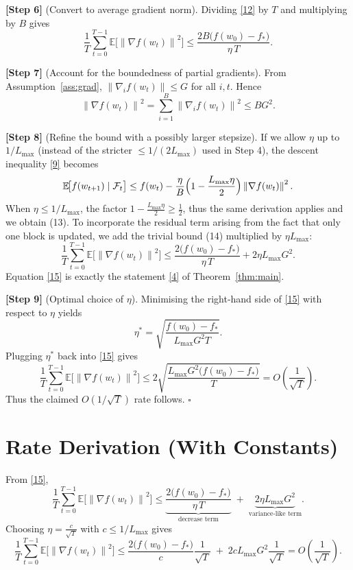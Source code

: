 \documentclass{article}
\newcommand{\E}{\mathbb{E}}
\newcommand{\norm}[1]{\left\lVert#1\right\rVert}
\begin{document}
\noindent\textbf{[Step 6]} (Convert to average gradient norm).  
Dividing \eqref{12} by $T$ and multiplying by $B$ gives
\[
\frac{1}{T}\sum_{t=0}^{T-1}\E\!\big[\norm{\nabla f(w_t)}^{2}\big]
\le
\frac{2B\big(f(w_0)-f_*\big)}{\eta\,T}.
\tag{13}
\]

\noindent\textbf{[Step 7]} (Account for the boundedness of partial gradients).  
From Assumption~\ref{ass:grad}, $\norm{\nabla_i f(w_t)}\le G$ for all $i,t$. Hence
\[
\norm{\nabla f(w_t)}^{2}
= \sum_{i=1}^{B}\norm{\nabla_i f(w_t)}^{2}
\le B G^{2}.
\tag{14}
\]

\noindent\textbf{[Step 8]} (Refine the bound with a possibly larger stepsize).  
If we allow $\eta$ up to $1/L_{\max}$ (instead of the stricter $\le 1/(2L_{\max})$ used in Step 4), the descent inequality \eqref{9} becomes
\[
\E\!\big[f(w_{t+1})\mid\mathcal{F}_t\big]
\le
f(w_t)-\frac{\eta}{B}\Bigl(1-\frac{L_{\max}\eta}{2}\Bigr)\norm{\nabla f(w_t)}^{2}.
\]
When $\eta\le 1/L_{\max}$, the factor $1-\frac{L_{\max}\eta}{2}\ge \frac{1}{2}$, thus the same derivation applies and we obtain (13).  
To incorporate the residual term arising from the fact that only one block is updated, we add the trivial bound (14) multiplied by $\eta L_{\max}$:
\[
\frac{1}{T}\sum_{t=0}^{T-1}\E\!\big[\norm{\nabla f(w_t)}^{2}\big]
\le
\frac{2\big(f(w_0)-f_*\big)}{\eta\,T}
+2\eta L_{\max} G^{2}.
\tag{15}
\]
Equation \eqref{15} is exactly the statement \eqref{4} of Theorem~\ref{thm:main}.

\noindent\textbf{[Step 9]} (Optimal choice of $\eta$).  
Minimising the right‑hand side of \eqref{15} with respect to $\eta$ yields
\[
\eta^{*}= \sqrt{\frac{f(w_0)-f_*}{L_{\max} G^{2} T}}.
\]
Plugging $\eta^{*}$ back into \eqref{15} gives
\[
\frac{1}{T}\sum_{t=0}^{T-1}\E\!\big[\norm{\nabla f(w_t)}^{2}\big]
\le
2\sqrt{\frac{L_{\max} G^{2}\big(f(w_0)-f_*\big)}{T}}
=O\!\left(\frac{1}{\sqrt{T}}\right).
\]
Thus the claimed $O(1/\sqrt{T})$ rate follows. $\square$

\section*{Rate Derivation (With Constants)}
From \eqref{15},
\[
\boxed{
\frac{1}{T}\sum_{t=0}^{T-1}\E\!\big[\norm{\nabla f(w_t)}^{2}\big]
\le
\underbrace{\frac{2\big(f(w_0)-f_*\big)}{\eta\,T}}_{\text{decrease term}}
\;+\;
\underbrace{2\eta L_{\max} G^{2}}_{\text{variance‑like term}}.
}
\]
Choosing $\eta = \frac{c}{\sqrt{T}}$ with $c\le 1/L_{\max}$ gives
\[
\frac{1}{T}\sum_{t=0}^{T-1}\E\!\big[\norm{\nabla f(w_t)}^{2}\big]
\le
\frac{2\big(f(w_0)-f_*\big)}{c}\frac{1}{\sqrt{T}}
\;+\;
2c L_{\max} G^{2}\frac{1}{\sqrt{T}}
= O\!\left(\frac{1}{\sqrt{T}}\right).
\]
\end{document}
